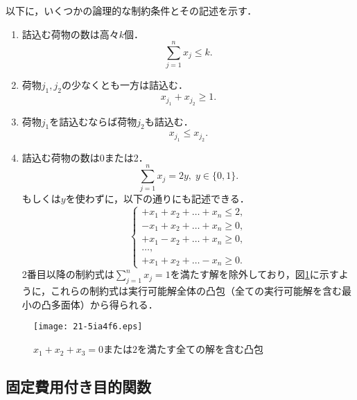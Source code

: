 \documentclass[japanese]{jnlp_1.4}
\begin{document}
以下に，いくつかの論理的な制約条件とその記述を示す．
\begin{enumerate}
\item 詰込む荷物の数は高々$k$個．
\begin{equation}
\sum_{j=1}^n x_j \le k.
\end{equation}

\item 荷物$j_1, j_2$の少なくとも一方は詰込む．
\begin{equation}
x_{j_1} + x_{j_2} \ge 1.
\end{equation}

\item 荷物$j_1$を詰込むならば荷物$j_2$も詰込む．
\begin{equation}
x_{j_1} \le x_{j_2}.
\end{equation}

\item 詰込む荷物の数は0または2．
\begin{equation}
\sum_{j=1}^n x_j = 2y, \; y \in \{ 0,1 \}.
\end{equation}
もしくは$y$を使わずに，以下の通りにも記述できる．
\pagebreak
\begin{equation}
\left\{
\begin{array}{l}
+x_1 +x_2 + \dots +x_n \le 2,\\
-x_1 +x_2 + \dots +x_n \ge 0,\\
+x_1 -x_2 + \dots +x_n \ge 0,\\
\dots,\\
+x_1 +x_2 + \dots -x_n \ge 0.
\end{array}
\right.
\end{equation}
2番目以降の制約式は$\sum_{j=1}^n x_j = 1$を満たす解を除外しており，図\ref{fig:logic1}に示すように，これらの制約式は実行可能解全体の凸包（全ての実行可能解を含む最小の凸多面体）から得られる．
\end{enumerate}


\begin{figure}[b]
\begin{center}
\texttt{[image: 21-5ia4f6.eps]}
\end{center}
\caption{$x_1 + x_2 + x_3 = 0$または$2$を満たす全ての解を含む凸包}
\label{fig:logic1}
\end{figure}


\subsection{固定費用付き目的関数}
\label{sec:fixed-cost}
\end{document}
